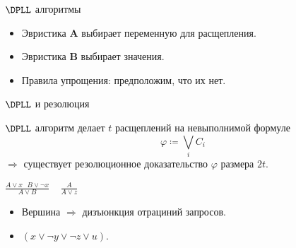 \begin{frame}{$\DPLL$ алгоритмы}

    \begin{center}
                
    \end{center}

    
	\pause
    \pause
    \pause
    \pause
    \pause
    \begin{itemize}
        \item Эвристика $\mathbf{A}$ выбирает переменную для расщепления.
    	\pause
	    \item Эвристика $\mathbf{B}$ выбирает значения.
    	\pause
    	\item Правила упрощения: \alert{предположим, что их нет}.
    \end{itemize}
\end{frame}

\begin{frame}{$\DPLL$ и резолюция}
    
    \begin{theorem}
        $\DPLL$ алгоритм делает $t$ расщеплений на невыполнимой формуле
        $$\varphi \coloneqq \bigvee\limits_i C_i$$
        $\Rightarrow$ существует резолюционное доказательство $\varphi$ размера $2t$.
    \end{theorem}

    \pause

    \begin{minipage}{0.58\linewidth}
        \centering
        
    \end{minipage}
    \pause
    \begin{minipage}{0.4\linewidth}
        \centering
        $\frac{A \lor x ~~~ B \lor \neg x}{A \lor B} ~~~~~ \frac{A}{A \lor z}$
        \begin{itemize}
            \item Вершина $\Rightarrow$ дизъюнкция отрациний запросов.
            \item $(x \lor \neg y \lor \neg z \lor u)$.
        \end{itemize}
    \end{minipage}

\end{frame}


